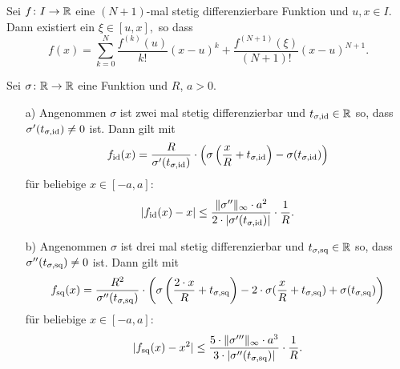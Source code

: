 \begin{lem}
\label{lem:lagrange}
Sei $f \colon I \to \mathbb{R}$ eine $(N + 1)$-mal stetig differenzierbare Funktion und $u, x \in I$. Dann existiert ein $\xi \in [u, x],$ so dass $$f(x) = \sum_{k = 0}^N \frac{f^{(k)}(u)}{k!}(x - u)^k + \frac{f^{(N + 1)}(\xi)}{(N + 1)!}(x - u)^{N + 1}.$$
\end{lem}
\begin{lem}
  \label{lem:1}
  Sei $\sigma \colon \mathbb{R} \to \mathbb{R}$ eine Funktion und $R$, $a > 0$.
  \begin{itemize}
  \item[a)] Angenommen $\sigma$ ist zwei mal stetig differenzierbar und $t_{\sigma,\mathrm{id}} \in \mathbb{R}$ so, dass $\sigma'(t_{\sigma, \mathrm{id}}) \neq 0$ ist. Dann gilt mit
  $$ f_{\mathrm{id}}(x) = \frac{R}{\sigma'(t_{\sigma, \mathrm{id}})} \cdot \left(\sigma\left(\frac{x}{R} + t_{\sigma, \mathrm{id}}\right) - \sigma(t_{\sigma, \mathrm{id}})\right)$$
  für beliebige $x \in [-a, a]\colon$ 
  $$ |f_{\mathrm{id}}(x) - x| \leq \frac{\|\sigma''\|_{\infty} \cdot a^2}{2 \cdot |\sigma'(t_{\sigma, \mathrm{id}})|} \cdot \frac{1}{R}.$$
  \item[b)] Angenommen $\sigma$ ist drei mal stetig differenzierbar und $t_{\sigma,\mathrm{sq}} \in \mathbb{R}$ so, dass $\sigma''(t_{\sigma, \mathrm{sq}}) \neq 0$ ist. Dann gilt mit
  $$ f_{\mathrm{sq}}(x) = \frac{R^2}{\sigma''(t_{\sigma, \mathrm{sq}})} \cdot \left(\sigma\left(\frac{2 \cdot x}{R} + t_{\sigma, \mathrm{sq}}\right) - 2 \cdot \sigma(\frac{x}{R} + t_{\sigma, \mathrm{sq}})+ \sigma(t_{\sigma, \mathrm{sq}})\right)$$
  für beliebige $x \in [-a, a]\colon$ 
  $$ |f_{\mathrm{sq}}(x) - x^2| \leq \frac{5 \cdot \|\sigma'''\|_{\infty} \cdot a^3}{3 \cdot |\sigma''(t_{\sigma, \mathrm{sq}})|} \cdot \frac{1}{R}.$$
  \end{itemize}
\end{lem}

